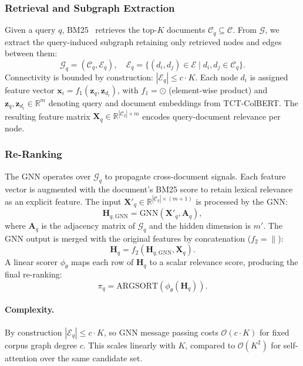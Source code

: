 \documentclass[runningheads]{llncs}
\begin{document}
\subsubsection*{Retrieval and Subgraph Extraction}
Given a query $q$, BM25~\cite{bm25} retrieves the top-$K$ documents $\mathcal{C}_q \subseteq \mathcal{C}$. From $\mathcal{G}$, we extract the query-induced subgraph retaining only retrieved nodes and edges between them:
\begin{equation} \label{eq:subgraph}
    \mathcal{G}_{q} = (\mathcal{C}_q, \mathcal{E}_q), \quad \mathcal{E}_q = \{(d_i,d_j) \in \mathcal{E} \;|\; d_i,d_j \in \mathcal{C}_q\}.
\end{equation}
Connectivity is bounded by construction: $|\mathcal{E}_q| \leq c \cdot K$. Each node $d_i$ is assigned feature vector $\mathbf{x}_i = f_1(\mathbf{z}_{q}, \mathbf{z}_{d_i})$, with $f_1 = \odot$ (element-wise product) and $\mathbf{z}_{q}, \mathbf{z}_{d_i} \in \mathbb{R}^m$ denoting query and document embeddings from TCT-ColBERT. The resulting feature matrix $\mathbf{X}_q \in \mathbb{R}^{|\mathcal{C}_q| \times m}$ encodes query-document relevance per node.

\subsubsection*{Re-Ranking}
The GNN operates over $\mathcal{G}_q$ to propagate cross-document signals. Each feature vector is augmented with the document's BM25 score to retain lexical relevance as an explicit feature. The input $\mathbf{X}'_q \in \mathbb{R}^{|\mathcal{C}_q| \times (m+1)}$ is processed by the GNN:
\begin{equation}
\label{eq:local_interactions}
    \mathbf{H}_{q,\text{GNN}} = \text{GNN}(\mathbf{X'}_q, \mathbf{A}_q),
\end{equation}
where $\mathbf{A}_q$ is the adjacency matrix of $\mathcal{G}_q$ and the hidden dimension is $m'$. The GNN output is merged with the original features by concatenation ($f_2 = \|$):
\begin{equation}
    \mathbf{H}_q = f_2\left(\mathbf{H}_{q,\text{GNN}}, \mathbf{X}_q\right).
\end{equation}
A linear scorer $\phi_{\theta}$ maps each row of $\mathbf{H}_q$ to a scalar relevance score, producing the final re-ranking:
\begin{equation}
    \pi_q = \text{ARGSORT}(\phi_{\theta}(\mathbf{H}_q)).
\end{equation}

\paragraph{Complexity.} By construction $|\mathcal{E}_q| \leq c \cdot K$, so GNN message passing costs $\mathcal{O}(c \cdot K)$ for fixed corpus graph degree $c$. This scales linearly with $K$, compared to $\mathcal{O}(K^2)$ for self-attention over the same candidate set.
\end{document}
